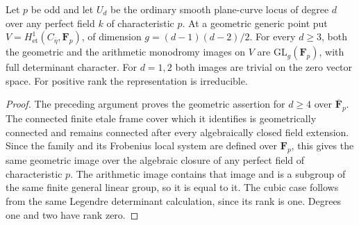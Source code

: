 \begin{theorem}\label{thm:plane-odd-all-groups}
Let $p$ be odd and let $U_d$ be the ordinary smooth plane-curve locus
of degree $d$ over any perfect field $k$ of characteristic $p$.  At a
geometric generic point put
$V=H^1_{\mathrm{et}}(C_{\bar\eta},\mathbf F_p)$, of dimension
$g=(d-1)(d-2)/2$.  For every $d\geq3$, both the geometric and the
arithmetic monodromy images on $V$ are
$\mathrm{GL}_g(\mathbf F_p)$, with full determinant character.
For $d=1,2$ both images are trivial on the zero vector space.
For positive rank the representation is irreducible.
\end{theorem}

\begin{proof}
The preceding argument proves the geometric assertion for $d\geq4$
over $\overline{\mathbf F}_p$.  The connected finite etale frame cover
which it identifies is geometrically connected and remains connected
after every algebraically closed field extension.  Since the family
and its Frobenius local system are defined over $\mathbf F_p$, this
gives the same geometric image over the algebraic closure of any
perfect field of characteristic $p$.
The arithmetic image contains that image and is a subgroup of the
same finite general linear group, so it is equal to it.  The cubic
case follows from the same Legendre determinant calculation, since
its rank is one.  Degrees one and two have rank zero.
\end{proof}
